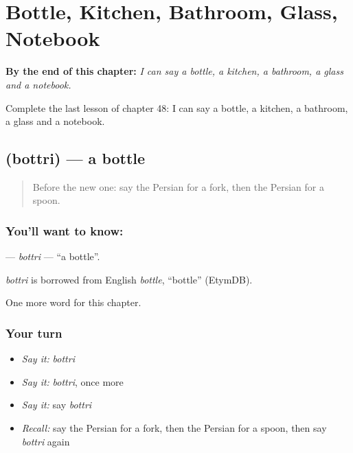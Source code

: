 
\chapter{Bottle, Kitchen, Bathroom, Glass, Notebook}
\label{ch:fa-bottle-kitchen-bathroom-glass-notebook}

\begin{chapteropening}
\textbf{By the end of this chapter:} \emph{I can say a bottle, a kitchen, a bathroom, a glass and a notebook.}

Complete the last lesson of chapter 48: I can say a bottle, a kitchen, a bathroom, a glass and a notebook.
\end{chapteropening}

\section[\texorpdfstring{\fa{بطری} (bottri)}{بطری (bottri)}]{ (bottri) — a bottle}

\label{lesson:FA-C48-bottri}



\begin{quote}
Before the new one: say the Persian for a fork, then the Persian for a spoon.
\end{quote}

\subsection*{You'll want to know: }
\textbf{} — \emph{bottri} — \textquotedblleft{}a bottle\textquotedblright{}.

\begin{cousinweb}
\emph{bottri} is borrowed from English \emph{bottle}, \textquotedblleft{}bottle\textquotedblright{} (EtymDB).
\end{cousinweb}

\begin{grammarlens}[title={What you've built}]
One more word for this chapter.
\end{grammarlens}

\subsection*{Your turn}
\begin{itemize}
\raggedright
  \item \emph{Say it:} \emph{bottri}
  \item \emph{Say it:} \emph{bottri}, once more
  \item \emph{Say it:} say \emph{bottri}
  \item \emph{Recall:} say the Persian for a fork, then the Persian for a spoon, then say \emph{bottri} again
\end{itemize}

